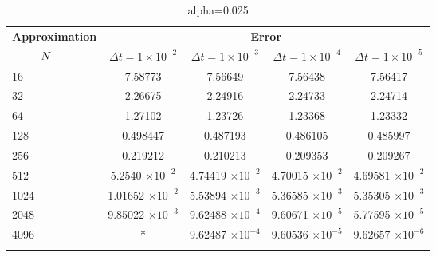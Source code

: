 \begin{table}
	\begin{tabular}{lcccc}
		\toprule
		\multicolumn{1}{c}{\textbf{Approximation}} & \multicolumn{4}{c}{\textbf{Error}} \\
		$\hspace{9mm}N$ & $\Delta t=1\times 10^{-2}$ & $\Delta t=1\times 10^{-3}$ & $\Delta t=1\times 10^{-4}$ & $\Delta t=1\times 10^{-5}$ \\
		\midrule
		\hspace{7mm} 16 & 7.58773    & 7.56649     & 7.56438     & 7.56417     \\
		\midrule
		\hspace{7mm} 32 & 2.26675    & 2.24916     & 2.24733     & 2.24714     \\
		\midrule
		\hspace{7mm} 64 & 1.27102    & 1.23726     & 1.23368     & 1.23332     \\
		\midrule
		\hspace{7mm} 128 & 0.498447   & 0.487193    & 0.486105    & 0.485997    \\
		\midrule
		\hspace{7mm} 256 & 0.219212   & 0.210213    & 0.209353    & 0.209267    \\
		\midrule
		\hspace{7mm} 512 & 5.2540 $\times 10^{-2}$   & 4.74419 $\times 10^{-2}$  & 4.70015 $\times 10^{-2}$  & 4.69581  $\times 10^{-2}$   \\
		\midrule
		\hspace{7mm} 1024 & 1.01652  $\times 10^{-2}$  & 5.53894 $\times 10^{-3}$  & 5.36585 $\times 10^{-3}$  & 5.35305  $\times 10^{-3}$  \\
		\midrule
		\hspace{7mm} 2048 & 9.85022 $\times 10^{-3}$ & 9.62488  $\times 10^{-4}$ & 9.60671 $\times 10^{-5}$ & 5.77595 $\times 10^{-5}$ \\
		\midrule
		\hspace{7mm} 4096 & * & 9.62487 $\times 10^{-4}$ & 9.60536 $\times 10^{-5}$ & 9.62657 $\times 10^{-6}$ \\
		\\
		\bottomrule
	\end{tabular}
	\caption{alpha=0.025}
\end{table}

